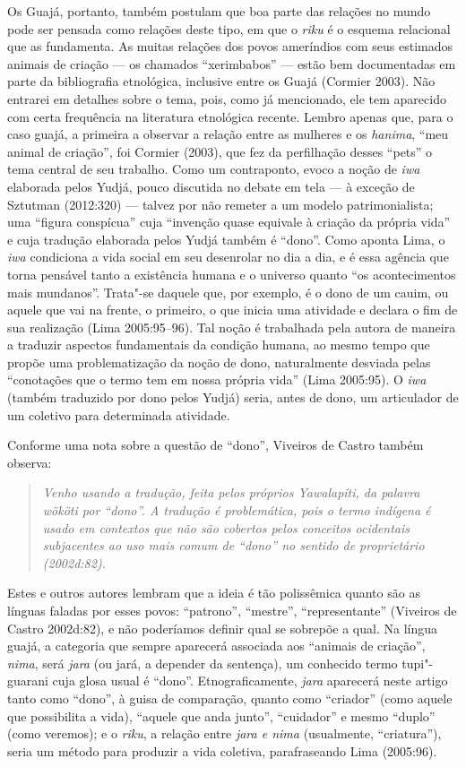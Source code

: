 Os Guajá, portanto, também postulam que boa parte das relações no mundo
pode ser pensada como relações deste tipo, em que o \emph{riku} é o
esquema relacional que as fundamenta. As muitas relações dos povos
ameríndios com seus estimados animais de criação --- os chamados
``xerimbabos'' --- estão bem documentadas em parte da bibliografia
etnológica, inclusive entre os Guajá (Cormier 2003). Não entrarei em
detalhes sobre o tema, pois, como já mencionado, ele tem aparecido com
certa frequência na literatura etnológica recente. Lembro apenas que,
para o caso guajá, a primeira a observar a relação entre as mulheres e
os \emph{hanima}, ``meu animal de criação'', foi Cormier (2003), que fez
da perfilhação desses ``pets'' o tema central de seu trabalho. Como um
contraponto, evoco a noção de \emph{iwa} elaborada pelos Yudjá, pouco
discutida no debate em tela --- à exceção de Sztutman (2012:320) --- talvez
por não remeter a um modelo patrimonialista; uma ``figura conspícua'' cuja
``invenção quase equivale à criação da própria vida'' e cuja tradução
elaborada pelos Yudjá também é ``dono''. Como aponta Lima, o \emph{iwa}
condiciona a vida social em seu desenrolar no dia a dia, e é essa
agência que torna pensável tanto a existência humana e o universo quanto
``os acontecimentos mais mundanos''. Trata"-se daquele que, por exemplo,
é o dono de um cauim, ou aquele que vai na frente, o primeiro, o que
inicia uma atividade e declara o fim de sua realização (Lima
2005:95--96). Tal noção é trabalhada pela autora de maneira a traduzir
aspectos fundamentais da condição humana, ao mesmo tempo que propõe uma
problematização da noção de dono, naturalmente desviada pelas
``conotações que o termo tem em nossa própria vida'' (Lima 2005:95). O
\emph{iwa} (também traduzido por dono pelos Yudjá) seria, antes de dono,
um articulador de um coletivo para determinada atividade.

Conforme uma nota sobre a questão de ``dono'', Viveiros de Castro também
observa:

\begin{quote}
\emph{Venho usando a tradução, feita pelos próprios Yawalapíti, da palavra
\emph{wököti} por ``dono''. A tradução é problemática, pois o termo indígena é usado em
contextos que não são cobertos pelos conceitos ocidentais subjacentes ao uso mais
comum de ``dono'' no sentido de proprietário (2002d:82).}
\end{quote}

Estes e outros autores lembram que a ideia é tão polissêmica quanto são
as línguas faladas por esses povos: ``patrono'', ``mestre'', ``representante''
(Viveiros de Castro 2002d:82), e não poderíamos definir qual se sobrepõe
a qual. Na língua guajá, a categoria que sempre aparecerá associada aos
``animais de criação'', \emph{nima}, será \emph{jara} (ou jará, a depender
da sentença), um conhecido termo tupi"-guarani cuja glosa usual é ``dono''.
Etnograficamente, \emph{jara} aparecerá neste artigo tanto como ``dono'',
à guisa de comparação, quanto como ``criador'' (como aquele que
possibilita a vida), ``aquele que anda junto'', ``cuidador'' e mesmo ``duplo''
(como veremos); e o \emph{riku}, a relação entre \emph{jara e nima}
(usualmente, ``criatura''), seria um método para produzir a vida
coletiva, parafraseando Lima (2005:96).

